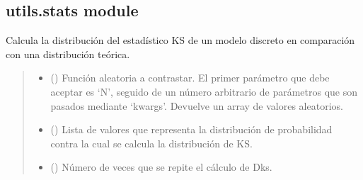 \documentclass[letterpaper,10pt,english]{sphinxmanual}
\begin{document}
\subsection{utils.stats module}
\label{\detokenize{utils.stats:module-utils.stats}}\label{\detokenize{utils.stats:utils-stats-module}}\label{\detokenize{utils.stats::doc}}

\begin{fulllineitems}
\label{\detokenize{utils.stats:utils.stats.Dks_montecarlo_discrete}}
\pysigstartsignatures
{}
\pysigstopsignatures
\sphinxAtStartPar
Calcula la distribución del estadístico KS de un modelo discreto en comparación con una distribución teórica.
\begin{quote}\begin{description}
\begin{itemize}
\item {} 
\sphinxAtStartPar
{} () \textendash{} Función aleatoria a contrastar. El primer parámetro que debe aceptar es ‘N’, seguido de un número arbitrario de
parámetros que son pasados mediante ‘kwargs’. Devuelve un array de valores aleatorios.

\item {} 
\sphinxAtStartPar
{} () \textendash{} Lista de valores que representa la distribución de probabilidad contra la cual se calcula la distribución de KS.

\item {} 
\sphinxAtStartPar
{} () \textendash{} Número de veces que se repite el cálculo de Dks.


\end{itemize}
\end{description}
\end{quote}
\end{fulllineitems}
\end{document}
